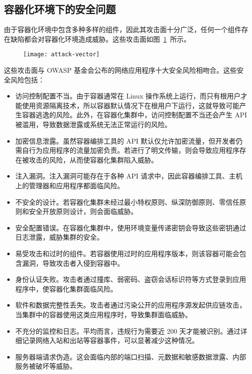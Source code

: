 {\subsection{容器化环境下的安全问题}

由于容器化环境中包含多种多样的组件，因此其攻击面十分广泛，任何一个组件存在缺陷都会对容器化环境造成威胁。这些攻击面如图~\ref{fig:attack-vector}~所示\citep{liz2018}。

\begin{figure}[t]
    \centering
    \texttt{[image: attack-vector]}
    \label{fig:attack-vector}

\end{figure}

这些攻击面与 OWASP 基金会公布的网络应用程序十大安全风险\citep{owasp}相吻合。这些安全风险包括\citep{liz2020}：

\begin{itemize}
    \item 访问控制配置不当。由于容器通常在 Linux 操作系统上运行，而只有根用户才能使用资源隔离技术，所以容器默认情况下在根用户下运行，这就导致可能产生容器逃逸的风险。此外，在容器化集群中，访问控制配置不当还会产生 API 被滥用，导致数据泄露或系统无法正常运行的风险。
    \item 加密信息泄露。虽然容器编排工具的 API 默认仅允许加密流量，但开发者仍需自行为应用程序的流量加密负责。若进行了明文传输，则会导致应用程序存在被攻击的风险，从而使容器化集群陷入威胁。
    \item 注入漏洞。注入漏洞可能存在于各种 API 请求中，因此容器编排工具、主机上的管理器和应用程序都面临风险。
    \item 不安全的设计。若容器化集群未经过最小特权原则、纵深防御原则、零信任原则和安全开放原则设计，则会面临威胁。
    \item 安全配置错误。在容器化集群中，使用环境变量传递密钥会导致这些密钥通过日志泄露，威胁集群的安全。
    \item 易受攻击和过时的组件。若容器使用过时的应用程序版本，则该容器可能会包含漏洞，导致攻击者入侵到容器中。
    \item 身份认证失败。攻击者通过撞库、弱密码、盗窃会话标识符等方式登录到应用程序中，使容器化集群面临风险。
    \item 软件和数据完整性丢失。攻击者通过污染公开的应用程序源发起供应链攻击，当集群中的容器使用这类应用程序时，导致集群面临威胁。
    \item 不充分的监控和日志。平均而言，违规行为需要近 200 天才能被识别\citep{liz2020}。通过详细记录网络入站和出站等容器事件，可以显著减少这种情况。
    \item 服务器端请求伪造。这会面临内部的端口扫描、元数据和敏感数据泄露、内部服务被破坏等威胁。
\end{itemize}

}
